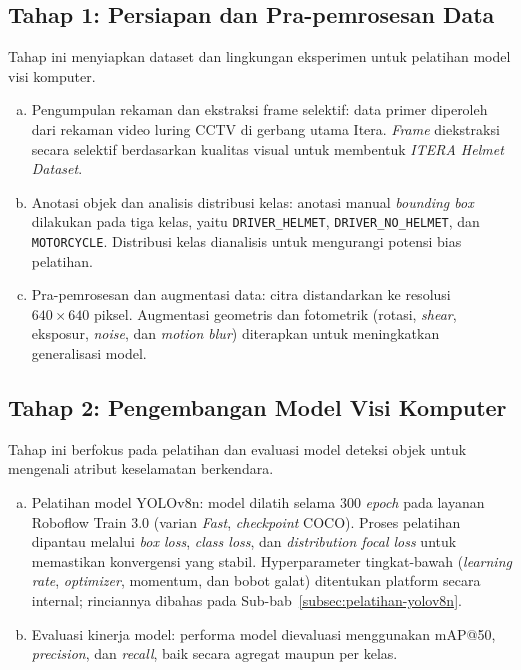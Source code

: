 \subsection{Tahap 1: Persiapan dan Pra-pemrosesan Data}
Tahap ini menyiapkan dataset dan lingkungan eksperimen untuk pelatihan model visi komputer.
\begin{enumerate}[a.]
\item {Pengumpulan rekaman dan ekstraksi frame selektif}: data primer diperoleh dari rekaman video luring CCTV di gerbang utama Itera. \textit{Frame} diekstraksi secara selektif berdasarkan kualitas visual untuk membentuk \textit{ITERA Helmet Dataset}.
\item {Anotasi objek dan analisis distribusi kelas}: anotasi manual \textit{bounding box} dilakukan pada tiga kelas, yaitu \texttt{DRIVER\_HELMET}, \texttt{DRIVER\_NO\_HELMET}, dan \texttt{MOTORCYCLE}. Distribusi kelas dianalisis untuk mengurangi potensi bias pelatihan.
\item {Pra-pemrosesan dan augmentasi data}: citra distandarkan ke resolusi $640 \times 640$ piksel. Augmentasi geometris dan fotometrik (rotasi, \textit{shear}, eksposur, \textit{noise}, dan \textit{motion blur}) diterapkan untuk meningkatkan generalisasi model.
\end{enumerate}

\subsection{Tahap 2: Pengembangan Model Visi Komputer}
Tahap ini berfokus pada pelatihan dan evaluasi model deteksi objek untuk mengenali atribut keselamatan berkendara.
\begin{enumerate}[a.]
\item {Pelatihan model YOLOv8n}: model dilatih selama 300 \textit{epoch} pada layanan Roboflow Train 3.0 (varian \textit{Fast}, \textit{checkpoint} COCO). Proses pelatihan dipantau melalui \textit{box loss}, \textit{class loss}, dan \textit{distribution focal loss} untuk memastikan konvergensi yang stabil. Hyperparameter tingkat-bawah (\textit{learning rate}, \textit{optimizer}, momentum, dan bobot galat) ditentukan platform secara internal; rinciannya dibahas pada Sub-bab~\ref{subsec:pelatihan-yolov8n}.
\item {Evaluasi kinerja model}: performa model dievaluasi menggunakan mAP@50, \textit{precision}, dan \textit{recall}, baik secara agregat maupun per kelas.
\end{enumerate}

